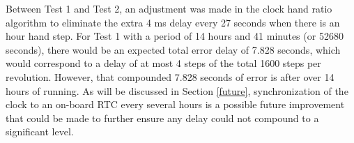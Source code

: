 \documentclass[11pt]{article}
\begin{document}
\begin{table}[h!]
    \caption{Tests of the Analog Clock Hand Ratios over Extended Periods of Time}
\label{tab:analogTest}
\end{table}


Between Test 1 and Test 2, an adjustment was made in the clock hand ratio algorithm to eliminate the extra 4 ms delay every 27 seconds when there is an hour hand step. For Test 1 with a period of 14 hours and 41 minutes (or 52680 seconds), there would be an expected total error delay of 7.828 seconds, which would correspond to a delay of at most 4 steps of the total 1600 steps per revolution. However, that compounded 7.828 seconds of error is after over 14 hours of running. As will be discussed in Section \ref{future}, synchronization of the clock to an on-board RTC every several hours is a possible future improvement that could be made to further ensure any delay could not compound to a significant level. 
\end{document}
